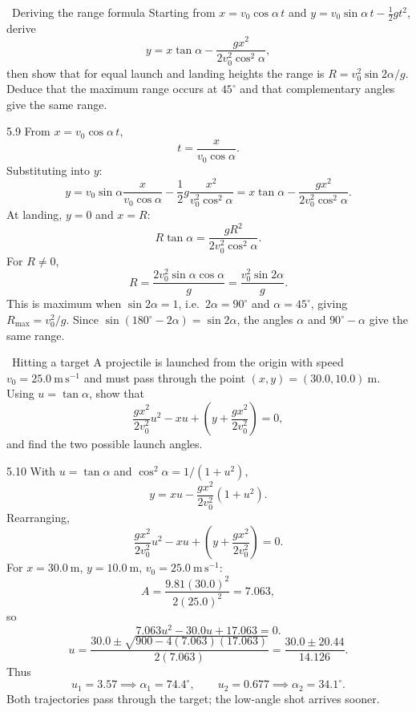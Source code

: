 \begin{exercise}{\mastery\ Deriving the range formula}
Starting from $x=v_0\cos\alpha\,t$ and
$y=v_0\sin\alpha\,t-\frac12gt^2$, derive
\[
y=x\tan\alpha-\frac{gx^2}{2v_0^2\cos^2\alpha},
\]
then show that for equal launch and landing heights the range is
$R=v_0^2\sin2\alpha/g$. Deduce that the maximum range occurs at $45^\circ$ and
that complementary angles give the same range.
\end{exercise}

\begin{tabletworkspace}[6.5cm]
\end{tabletworkspace}

\begin{solution}{5.9}
From $x=v_0\cos\alpha\,t$,
\[
t=\frac{x}{v_0\cos\alpha}.
\]
Substituting into $y$:
\[
y=v_0\sin\alpha\frac{x}{v_0\cos\alpha}
-\frac12g\frac{x^2}{v_0^2\cos^2\alpha}
=x\tan\alpha-\frac{gx^2}{2v_0^2\cos^2\alpha}.
\]
At landing, $y=0$ and $x=R$:
\[
R\tan\alpha=\frac{gR^2}{2v_0^2\cos^2\alpha}.
\]
For $R\ne0$,
\[
R=\frac{2v_0^2\sin\alpha\cos\alpha}{g}
=\frac{v_0^2\sin2\alpha}{g}.
\]
This is maximum when $\sin2\alpha=1$, i.e.\ $2\alpha=90^\circ$ and
$\alpha=45^\circ$, giving $R_{\max}=v_0^2/g$. Since
$\sin(180^\circ-2\alpha)=\sin2\alpha$, the angles $\alpha$ and
$90^\circ-\alpha$ give the same range.
\end{solution}

\begin{exercise}{\mastery\ Hitting a target}
A projectile is launched from the origin with speed
$v_0=25.0\ \mathrm{m\,s^{-1}}$ and must pass through the point
$(x,y)=(30.0,10.0)\ \mathrm{m}$. Using $u=\tan\alpha$, show that
\[
\frac{gx^2}{2v_0^2}u^2-xu+\left(y+\frac{gx^2}{2v_0^2}\right)=0,
\]
and find the two possible launch angles.
\end{exercise}

\begin{tabletworkspace}[6.5cm]
\end{tabletworkspace}

\begin{solution}{5.10}
With $u=\tan\alpha$ and
$\cos^2\alpha=1/(1+u^2)$,
\[
y=xu-\frac{gx^2}{2v_0^2}(1+u^2).
\]
Rearranging,
\[
\frac{gx^2}{2v_0^2}u^2-xu+\left(y+\frac{gx^2}{2v_0^2}\right)=0.
\]
For $x=30.0\ \mathrm{m}$, $y=10.0\ \mathrm{m}$, $v_0=25.0\ \mathrm{m\,s^{-1}}$:
\[
A=\frac{9.81(30.0)^2}{2(25.0)^2}=7.063,
\]
so
\[
7.063u^2-30.0u+17.063=0.
\]
\[
u=\frac{30.0\pm\sqrt{900-4(7.063)(17.063)}}{2(7.063)}
=\frac{30.0\pm20.44}{14.126}.
\]
Thus
\[
u_1=3.57\implies\alpha_1=74.4^\circ,\qquad
u_2=0.677\implies\alpha_2=34.1^\circ.
\]
Both trajectories pass through the target; the low-angle shot arrives sooner.
\end{solution}

